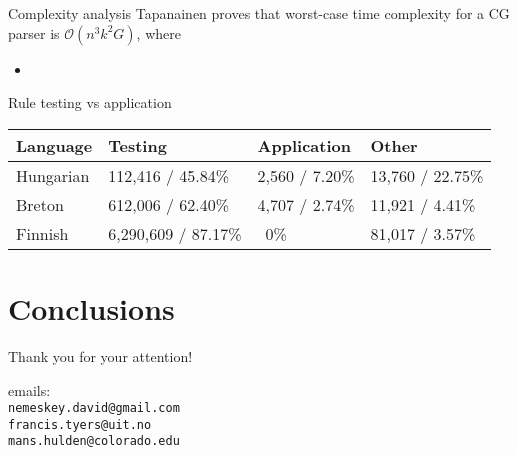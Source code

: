 \documentclass[utf8x,t,aspectratio=169]{beamer}
\newcommand{\vitem}{\item \vspace{4pt}}
\begin{document}
\begin{frame}{Complexity analysis}
Tapanainen proves that worst-case time complexity for a CG parser is
$\mathcal{O}(n^3k^2G)$, where
\begin{itemize}
    \vitem 
\end{itemize}
\end{frame}

\begin{frame}{Rule testing vs application}

\begin{tabular}{| l | l | l | l |}
\hline
\textbf{Language} & \textbf{Testing} & \textbf{Application} & \textbf{Other} \\
\hline
Hungarian & 112,416 / 45.84\% & 2,560 / 7.20\% & 13,760 / 22.75\% \\
Breton & 612,006 / 62.40\% & 4,707 / 2.74\% & 11,921 / 4.41\% \\
Finnish & 6,290,609 / 87.17\% & ~0\% & 81,017 / 3.57\% \\
\hline
\end{tabular}

\end{frame}

\section{Conclusions}



\begin{frame}

\bigskip

\bigskip

{\huge Thank you for your attention!}

\bigskip
\bigskip
\bigskip

emails: \\ {\tt nemeskey.david@gmail.com \\ francis.tyers@uit.no \\ mans.hulden@colorado.edu} \\

\end{frame}
\end{document}
